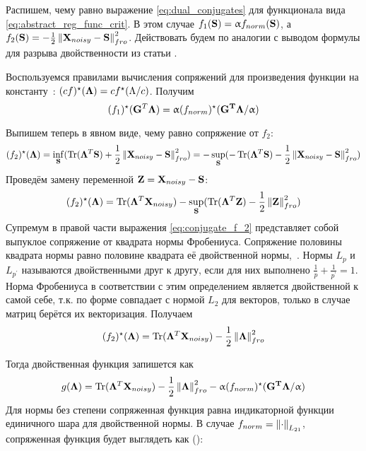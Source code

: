 Распишем, чему равно выражение \ref{eq:dual_conjugates} для функционала вида \ref{eq:abstract_reg_func_crit}.
В этом случае $f_1(\mathbf{S}) = \upalpha f_{norm}(\mathbf{S})$, а $f_2(\mathbf{S}) = - \frac{1}{2}\left\lVert\mathbf{X}_{noisy} - \mathbf{S}\right\rVert_{fro}^2$.
Действовать будем по аналогии с выводом формулы для разрыва двойственности из статьи \cite{gramfort_2012}.

Воспользуемся правилами вычисления сопряжений для произведения функции на константу~\cite{Boyd}: $(c f)^{\star}(\mathbf{\Lambda}) = c f^{\star}(\Lambda / c)$.
Получим
\begin{equation}
    (f_1)^{\star}(\mathbf{G}^T\mathbf{\Lambda}) =
    \upalpha (f_{norm})^{\star}(\mathbf{G^T\Lambda}/\upalpha)
\end{equation}

Выпишем теперь в явном виде, чему равно сопряжение от $f_2$:
\begin{equation*}
    (f_2)^{\star}(\mathbf{\Lambda}) =
    \inf_{\mathbf{S}}(\operatorname*{Tr}(\mathbf{\Lambda}^T\mathbf{S}) + \frac{1}{2}\left\lVert\mathbf{X}_{noisy} - \mathbf{S}\right\rVert_{fro}^2) =
    - \sup_{\mathbf{S}}(- \operatorname*{Tr}(\mathbf{\Lambda}^T\mathbf{S}) - \frac{1}{2}\left\lVert\mathbf{X}_{noisy} - \mathbf{S}\right\rVert_{fro}^2)
\end{equation*}
Проведём замену переменной $\mathbf{Z} = \mathbf{X}_{noisy} - \mathbf{S}$:
\begin{equation}
    (f_2)^{\star}(\mathbf{\Lambda}) =
    \operatorname*{Tr}(\mathbf{\Lambda}^T\mathbf{X}_{noisy}) - \sup_{\mathbf{S}}(\operatorname*{Tr}(\mathbf{\Lambda}^T\mathbf{Z}) - \frac{1}{2}\left\lVert\mathbf{Z}\right\rVert_{fro}^2)
    \label{eq:conjugate_f_2}
\end{equation}
Супремум в правой части выражения \ref{eq:conjugate_f_2} представляет собой выпуклое сопряжение
от квадрата нормы Фробениуса. Сопряжение половины квадрата нормы равно половине квадрата её двойственной нормы,~\cite{Boyd, gramfort_2012}.
Нормы $L_p$ и $L_{p^{\prime}}$ называются двойственными друг к другу, если для них выполнено $\frac{1}{p} + \frac{1}{p^{\prime}} = 1$.
Норма Фробениуса в соответствии с этим определением является двойственной к самой себе, т.к. по форме совпадает с нормой $L_2$ для векторов, только в
случае матриц берётся их векторизация. Получаем
\begin{equation}
    (f_2)^{\star}(\mathbf{\Lambda}) =
    \operatorname*{Tr}(\mathbf{\Lambda}^T\mathbf{X}_{noisy}) - \frac{1}{2}\left\lVert\mathbf{\Lambda}\right\rVert^2_{fro}
\end{equation}

Тогда двойственная функция запишется как 
\begin{equation}
    g(\mathbf{\Lambda}) =
    \operatorname*{Tr}(\mathbf{\Lambda}^T\mathbf{X}_{noisy}) - \frac{1}{2}\left\lVert\mathbf{\Lambda}\right\rVert^2_{fro} - \upalpha (f_{norm})^{\star}(\mathbf{G^T\Lambda}/\upalpha)
    \label{eq:dual_func}
\end{equation}
Для нормы без степени сопряженная функция равна индикаторной функции единичного шара для двойственной нормы.
В случае $f_{norm} = \left\lVert\cdot\right\rVert_{L_{21}}$, сопряженная функция будет выглядеть как (\cite{gramfort_2012}):

